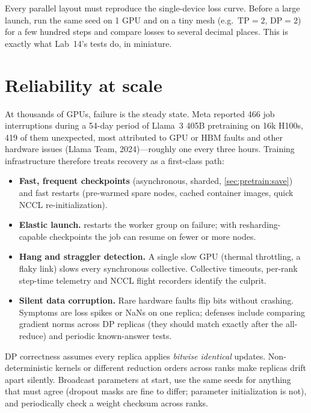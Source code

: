 \begin{pitfall}
Every parallel layout must reproduce the single-device loss curve. Before a large launch, run
the same seed on 1 GPU and on a tiny mesh (e.g.\ $\text{TP}=2$, $\text{DP}=2$) for a few hundred
steps and compare losses to several decimal places. This is exactly what Lab~14's tests do, in
miniature.
\end{pitfall}

\section{Reliability at scale}\label{sec:dist:reliability}

At thousands of GPUs, failure is the steady state. Meta reported 466 job interruptions during
a 54-day period of Llama~3 405B pretraining on 16k H100s, 419 of them unexpected, most
attributed to GPU or HBM faults and other hardware issues (Llama Team, 2024)---roughly one every
three hours. Training infrastructure therefore treats recovery as a first-class path:
\begin{itemize}
\item \textbf{Fast, frequent checkpoints} (asynchronous, sharded, \cref{sec:pretrain:save}) and
  fast restarts (pre-warmed spare nodes, cached container images, quick NCCL
  re-initialization).
\item \textbf{Elastic launch.}  restarts the worker group on failure; with
  resharding-capable checkpoints the job can resume on fewer or more nodes.
\item \textbf{Hang and straggler detection.} A single slow GPU (thermal throttling, a flaky
  link) slows every synchronous collective. Collective timeouts, per-rank step-time telemetry
  and NCCL flight recorders identify the culprit.
\item \textbf{Silent data corruption.} Rare hardware faults flip bits without crashing.
  Symptoms are loss spikes or NaNs on one replica; defenses include comparing gradient norms
  across DP replicas (they should match exactly after the all-reduce) and periodic
  known-answer tests.
\end{itemize}

\begin{pitfall}
DP correctness assumes every replica applies \emph{bitwise identical} updates. Non-deterministic
kernels or different reduction orders across ranks make replicas drift apart silently. Broadcast
parameters at start, use the same seeds for anything that must agree (dropout masks are fine to
differ; parameter initialization is not), and periodically check a weight checksum across ranks.
\end{pitfall}


